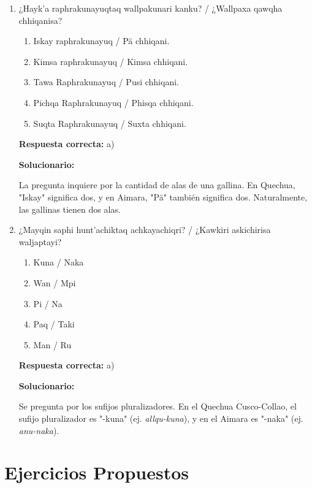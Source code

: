 \begin{enumerate}[resume]
	\item ¿Hayk'a raphrakunayuqtaq wallpakunari kanku? / ¿Wallpaxa qawqha chhiqanisa?
	\begin{enumerate}[label=\alph*)]
		\item Iskay raphrakunayuq / Pä chhiqani.
		\item Kimsa raphrakunayuq / Kimsa chhiqani.
		\item Tawa Raphrakunayuq / Pusi chhiqani.
		\item Pichqa Raphrakunayuq / Phisqa chhiqani.
		\item Suqta Raphrakunayuq / Suxta chhiqani.
	\end{enumerate}
	\textbf{Respuesta correcta:} a)

	\vspace{2mm}
	\textbf{Solucionario:}

	La pregunta inquiere por la cantidad de alas de una gallina. En Quechua, "Iskay" significa dos, y en Aimara, "Pä" también significa dos. Naturalmente, las gallinas tienen dos alas.

	\vspace{6mm}

	\item ¿Mayqin saphi hunt'achiktaq achkayachiqri? / ¿Kawkiri askichirisa waljaptayi?
	\begin{enumerate}[label=\alph*)]
		\item Kuna / Naka
		\item Wan / Mpi
		\item Pi / Na
		\item Paq / Taki
		\item Man / Ru
	\end{enumerate}
	\textbf{Respuesta correcta:} a)

	\vspace{2mm}
	\textbf{Solucionario:}

	Se pregunta por los sufijos pluralizadores. En el Quechua Cusco-Collao, el sufijo pluralizador es "-kuna" (ej. \textit{allqu-kuna}), y en el Aimara es "-naka" (ej. \textit{anu-naka}).

	\vspace{6mm}
\end{enumerate}

\newpage


\section*{Ejercicios Propuestos}

